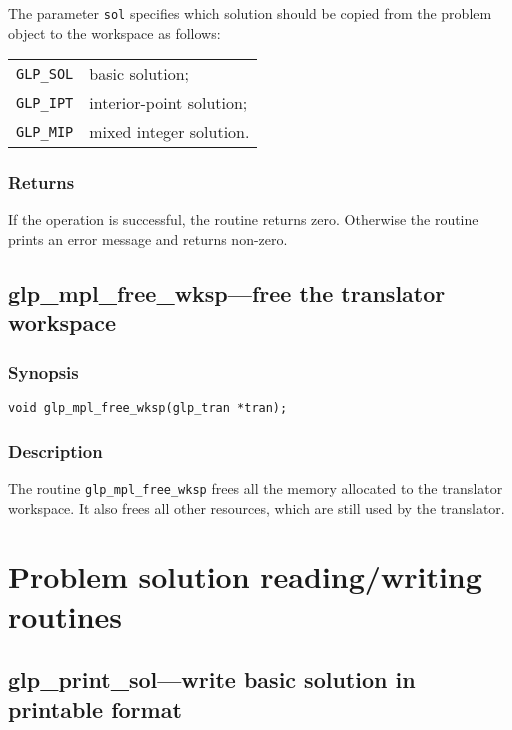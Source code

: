 The parameter \verb|sol| specifies which solution should be copied
from the problem object to the workspace as follows:

\begin{tabular}{@{}ll}
\verb|GLP_SOL| & basic solution; \\
\verb|GLP_IPT| & interior-point solution; \\
\verb|GLP_MIP| & mixed integer solution. \\
\end{tabular}

\subsubsection*{Returns}

If the operation is successful, the routine returns zero. Otherwise
the routine prints an error message and returns non-zero.

\subsection{glp\_mpl\_free\_wksp---free the translator workspace}

\subsubsection*{Synopsis}

\begin{verbatim}
void glp_mpl_free_wksp(glp_tran *tran);
\end{verbatim}

\subsubsection*{Description}

The routine \verb|glp_mpl_free_wksp| frees all the memory allocated to
the translator workspace. It also frees all other resources, which are
still used by the translator.


\newpage

\section{Problem solution reading/writing routines}

\subsection{glp\_print\_sol---write basic solution in printable format}


